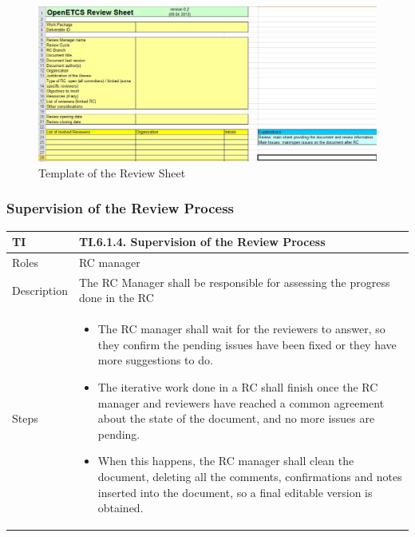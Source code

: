 \documentclass{template/openetcs_article}
\begin{document}
\begin{figure}
\centering
\includegraphics [width=\textwidth]{./figures/ReviewSheet.JPG}
\caption{Template of the Review Sheet}
\end{figure}

\subsubsection{Supervision of the Review Process}

\begin{flushleft}
\tablefirsthead{}
\tablehead{}
\tabletail{}
\tablelasttail{}
\begin{supertabular}{|m{2cm}|m{13cm}|}
\hline
{}
TI & 
TI.6.1.4. Supervision of the Review Process
\\\hline
Roles &
RC manager
\\\hline
Description &
The RC Manager shall be responsible for assessing the progress done in the RC
\\\hline
Steps &
\begin{itemize}
\item The RC manager shall wait for the reviewers to answer, so they confirm the pending issues have been fixed or they have more suggestions to do.
\item The iterative work done in a RC shall finish once the RC manager and reviewers have reached a common agreement about the state of the document, and no more issues are pending. \item When this happens, the RC manager shall clean the document, deleting all the comments, confirmations and notes inserted into the document, so a final editable version is obtained.
\end{itemize}
\\\hline
\end{supertabular}
\end{flushleft}
\end{document}
